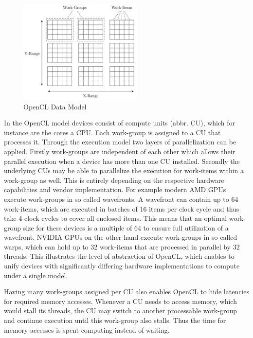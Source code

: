 \begin{figure}[!htb]	
	\includegraphics[width=0.55\textwidth]{drawings/opencl_data_model.pdf}
	\centering
	\caption{OpenCL Data Model}
	\label{img:opencl_data_model}
\end{figure}

In the OpenCL model devices consist of compute units (abbr. CU), which for instance are the cores a CPU. Each work-group is assigned to a CU that processes it. Through the execution model two layers of parallelization can be applied. Firstly work-groups are independent of each other which allows their parallel execution when a device has more than one CU installed. Secondly the underlying CUs may be able to parallelize the execution for work-items within a work-group as well. This is entirely depending on the respective hardware capabilities and vendor implementation. For example modern AMD GPUs execute work-groups in so called wavefronts. A wavefront can contain up to 64 work-items, which are executed in batches of 16 items per clock cycle and thus take 4 clock cycles to cover all enclosed items\cite{amd_opencl_spec}. This means that an optimal work-group size for these devices is a multiple of 64 to ensure full utilization of a wavefront.
NVIDIA GPUs on the other hand execute work-groups in so called warps, which can hold up to 32 work-items that are processed in parallel by 32 threads\cite{nvidia_pascal_spec}. This illustrates the level of abstraction of OpenCL, which enables to unify devices with significantly differing hardware implementations to compute under a single model.

Having many work-groups assigned per CU also enables OpenCL to hide latencies for required memory accesses. Whenever a CU needs to access memory, which would stall its threads, the CU may switch to another processable work-group and continue execution until this work-group also stalls. Thus the time for memory accesses is spent computing instead of waiting.

